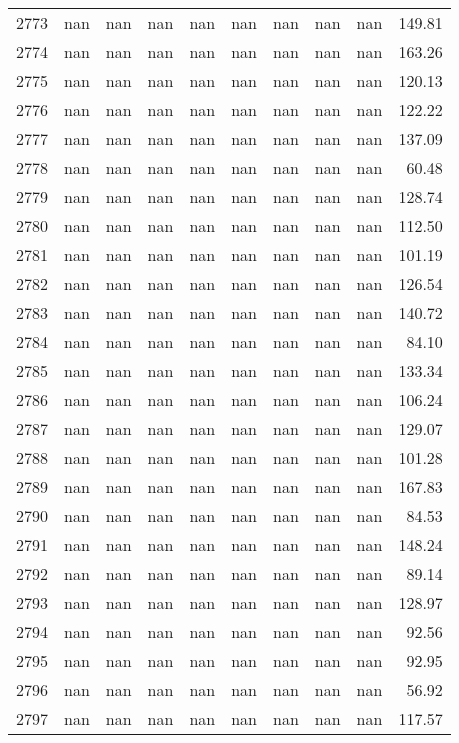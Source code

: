 \begin{tabular}{lrrrrrrrrr}
2773 & nan & nan & nan & nan & nan & nan & nan & nan & 149.81 \\
2774 & nan & nan & nan & nan & nan & nan & nan & nan & 163.26 \\
2775 & nan & nan & nan & nan & nan & nan & nan & nan & 120.13 \\
2776 & nan & nan & nan & nan & nan & nan & nan & nan & 122.22 \\
2777 & nan & nan & nan & nan & nan & nan & nan & nan & 137.09 \\
2778 & nan & nan & nan & nan & nan & nan & nan & nan & 60.48 \\
2779 & nan & nan & nan & nan & nan & nan & nan & nan & 128.74 \\
2780 & nan & nan & nan & nan & nan & nan & nan & nan & 112.50 \\
2781 & nan & nan & nan & nan & nan & nan & nan & nan & 101.19 \\
2782 & nan & nan & nan & nan & nan & nan & nan & nan & 126.54 \\
2783 & nan & nan & nan & nan & nan & nan & nan & nan & 140.72 \\
2784 & nan & nan & nan & nan & nan & nan & nan & nan & 84.10 \\
2785 & nan & nan & nan & nan & nan & nan & nan & nan & 133.34 \\
2786 & nan & nan & nan & nan & nan & nan & nan & nan & 106.24 \\
2787 & nan & nan & nan & nan & nan & nan & nan & nan & 129.07 \\
2788 & nan & nan & nan & nan & nan & nan & nan & nan & 101.28 \\
2789 & nan & nan & nan & nan & nan & nan & nan & nan & 167.83 \\
2790 & nan & nan & nan & nan & nan & nan & nan & nan & 84.53 \\
2791 & nan & nan & nan & nan & nan & nan & nan & nan & 148.24 \\
2792 & nan & nan & nan & nan & nan & nan & nan & nan & 89.14 \\
2793 & nan & nan & nan & nan & nan & nan & nan & nan & 128.97 \\
2794 & nan & nan & nan & nan & nan & nan & nan & nan & 92.56 \\
2795 & nan & nan & nan & nan & nan & nan & nan & nan & 92.95 \\
2796 & nan & nan & nan & nan & nan & nan & nan & nan & 56.92 \\
2797 & nan & nan & nan & nan & nan & nan & nan & nan & 117.57 \\

\end{tabular}
